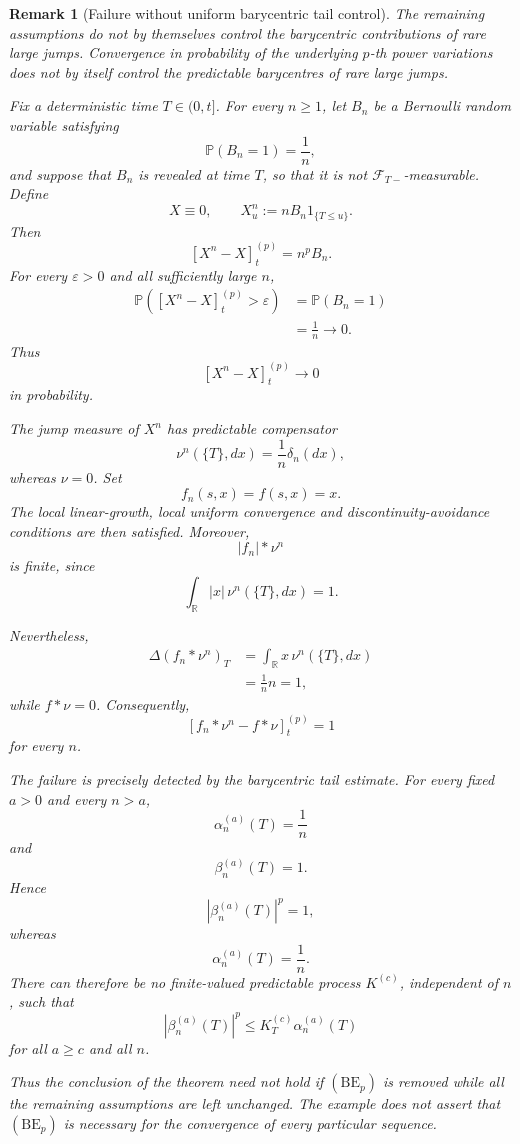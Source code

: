 \documentclass[a4paper,10pt]{article}
\newtheorem{rema}[thm]{Remark}
\renewcommand{\P}{\mathbb P}
\begin{document}
\begin{rema}[Failure without uniform barycentric tail control]
The remaining assumptions do not by themselves control the
barycentric contributions of rare large jumps. Convergence in probability of the underlying
\(p\)-th power variations does not by itself control the predictable
barycentres of rare large jumps.

Fix a deterministic time \(T\in(0,t]\). For every \(n\ge1\), let
\(B_n\) be a Bernoulli random variable satisfying
\[
        \P(B_n=1)=\frac1n,
\]
and suppose that \(B_n\) is revealed at time \(T\), so that it is not
\(\mathcal F_{T-}\)-measurable. Define
\[
        X\equiv0,
        \qquad
        X_u^n:=nB_n1_{\{T\le u\}}.
\]
Then
\[
        [X^n-X]^{(p)}_t=n^pB_n.
\]
For every \(\varepsilon>0\) and all sufficiently large \(n\),
\[
\begin{aligned}
\P\left(
        [X^n-X]^{(p)}_t>\varepsilon
\right)
&=
\P(B_n=1)
\\
&=
\frac1n
\longrightarrow0.
\end{aligned}
\]
Thus
\[
        [X^n-X]^{(p)}_t\longrightarrow0
\]
in probability.

The jump measure of \(X^n\) has predictable compensator
\[
        \nu^n(\{T\},dx)
        =
        \frac1n\delta_n(dx),
\]
whereas \(\nu=0\). Set
\[
        f_n(s,x)=f(s,x)=x.
\]
The local linear-growth, local uniform convergence and
discontinuity-avoidance conditions are then satisfied. Moreover,
\[
        |f_n|*\nu^n
\]
is finite, since
\[
        \int_{\mathbb R}|x|\,\nu^n(\{T\},dx)=1.
\]

Nevertheless,
\[
\begin{aligned}
\Delta(f_n*\nu^n)_T
&=
\int_{\mathbb R}x\,\nu^n(\{T\},dx)
\\
&=
\frac1n n
=
1,
\end{aligned}
\]
while \(f*\nu=0\). Consequently,
\[
        [f_n*\nu^n-f*\nu]^{(p)}_t=1
\]
for every \(n\).

The failure is precisely detected by the barycentric tail estimate.
For every fixed \(a>0\) and every \(n>a\),
\[
        \alpha_n^{(a)}(T)=\frac1n
\]
and
\[
        \beta_n^{(a)}(T)=1.
\]
Hence
\[
        |\beta_n^{(a)}(T)|^p=1,
\]
whereas
\[
        \alpha_n^{(a)}(T)=\frac1n.
\]
There can therefore be no finite-valued predictable process
\(K^{(c)}\), independent of \(n\), such that
\[
        |\beta_n^{(a)}(T)|^p
        \le
        K_T^{(c)}\alpha_n^{(a)}(T)
\]
for all \(a\ge c\) and all \(n\).

Thus the conclusion of the theorem need not hold if
\((\mathrm{BE}_p)\) is removed while all the remaining assumptions are
left unchanged. The example does not assert that
\((\mathrm{BE}_p)\) is necessary for the convergence of every
particular sequence.
\end{rema}
\end{document}
